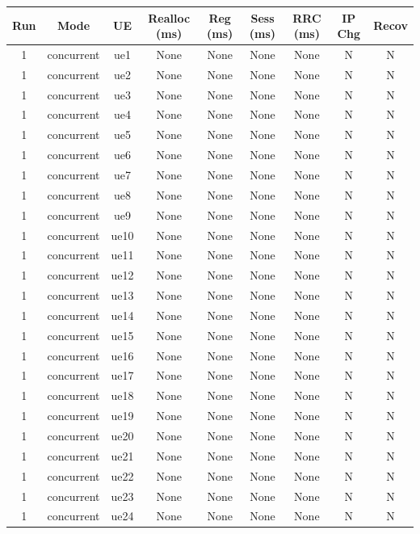 \begin{table}[ht]
\centering
\begin{tabular}{|c|c|c|c|c|c|c|c|c|}
\hline
Run & Mode & UE & Realloc (ms) & Reg (ms) & Sess (ms) & RRC (ms) & IP Chg & Recov \\
\hline
1 & concurrent & ue1 & None & None & None & None & N & N \\
1 & concurrent & ue2 & None & None & None & None & N & N \\
1 & concurrent & ue3 & None & None & None & None & N & N \\
1 & concurrent & ue4 & None & None & None & None & N & N \\
1 & concurrent & ue5 & None & None & None & None & N & N \\
1 & concurrent & ue6 & None & None & None & None & N & N \\
1 & concurrent & ue7 & None & None & None & None & N & N \\
1 & concurrent & ue8 & None & None & None & None & N & N \\
1 & concurrent & ue9 & None & None & None & None & N & N \\
1 & concurrent & ue10 & None & None & None & None & N & N \\
1 & concurrent & ue11 & None & None & None & None & N & N \\
1 & concurrent & ue12 & None & None & None & None & N & N \\
1 & concurrent & ue13 & None & None & None & None & N & N \\
1 & concurrent & ue14 & None & None & None & None & N & N \\
1 & concurrent & ue15 & None & None & None & None & N & N \\
1 & concurrent & ue16 & None & None & None & None & N & N \\
1 & concurrent & ue17 & None & None & None & None & N & N \\
1 & concurrent & ue18 & None & None & None & None & N & N \\
1 & concurrent & ue19 & None & None & None & None & N & N \\
1 & concurrent & ue20 & None & None & None & None & N & N \\
1 & concurrent & ue21 & None & None & None & None & N & N \\
1 & concurrent & ue22 & None & None & None & None & N & N \\
1 & concurrent & ue23 & None & None & None & None & N & N \\
1 & concurrent & ue24 & None & None & None & None & N & N \\

\end{tabular}
\end{table}
